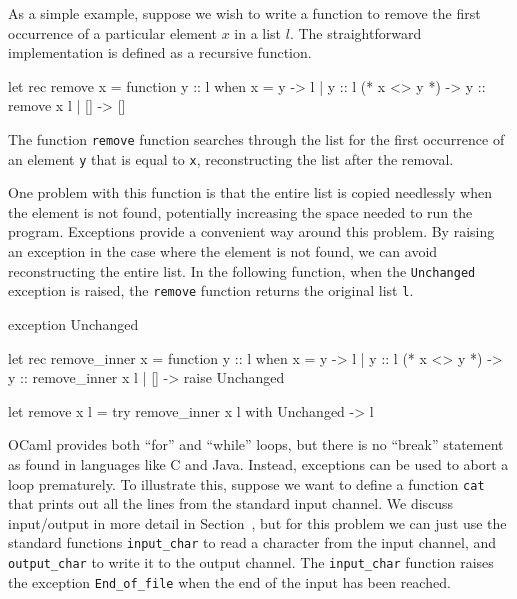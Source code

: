 
As a simple example, suppose we wish to write a function to remove the first occurrence of a
particular element $x$ in a list $l$.  The straightforward implementation is defined as a
recursive function.

\begin{ocaml}
let rec remove x = function
   y :: l when x = y -> l
 | y :: l (* x <> y *) -> y :: remove x l
 | [] -> []
\end{ocaml}
%
The function \hbox{\lstinline/remove/} function searches through the list for the first occurrence of an
element \hbox{\lstinline/y/} that is equal to \hbox{\lstinline/x/}, reconstructing the list after the removal.

One problem with this function is that the entire list is copied needlessly when the element is not
found, potentially increasing the space needed to run the program.  Exceptions provide a convenient
way around this problem.  By raising an exception in the case where the element is not found, we can
avoid reconstructing the entire list.  In the following function, when the \hbox{\lstinline/Unchanged/} exception
is raised, the \hbox{\lstinline/remove/} function returns the original list \hbox{\lstinline/l/}.

\begin{ocaml}
exception Unchanged

let rec remove_inner x = function
   y :: l when x = y ->
      l
 | y :: l (* x <> y *) ->
      y :: remove_inner x l
 | [] ->
      raise Unchanged

let remove x l =
   try remove_inner x l with
      Unchanged ->
         l
\end{ocaml}


OCaml provides both ``for'' and ``while'' loops, but there is no ``break''
statement as found in languages like C and Java.  Instead, exceptions can be used to abort a loop
prematurely.  To illustrate this, suppose we want to define a function \hbox{\lstinline/cat/} that prints out all
the lines from the standard input channel.  We discuss input/output in more detail in Section~, but for this problem we can just use the standard functions \hbox{\lstinline/input_char/}
to read a character from the input channel, and \hbox{\lstinline/output_char/} to write it to the output
channel.  The \hbox{\lstinline/input_char/} function raises the exception \hbox{\lstinline/End_of_file/} when the end of the
input has been reached.

